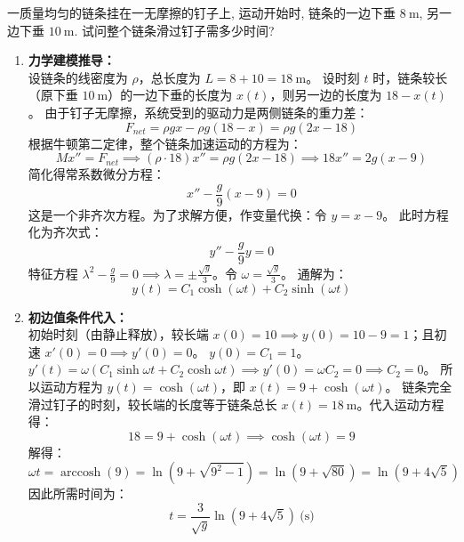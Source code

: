 \documentclass[lang=cn,11pt]{elegantbook}
\begin{document}
\begin{exercise}
一质量均匀的链条挂在一无摩擦的钉子上, 运动开始时, 链条的一边下垂 $8\ \mathrm{m}$, 另一边下垂 $10\ \mathrm{m}$. 试问整个链条滑过钉子需多少时间?
\end{exercise}
\begin{solution}
\begin{enumerate}
    \item \textbf{力学建模推导：}\\
    设链条的线密度为 $\rho$，总长度为 $L = 8 + 10 = 18\ \mathrm{m}$。
    设时刻 $t$ 时，链条较长（原下垂 $10\ \mathrm{m}$）的一边下垂的长度为 $x(t)$，则另一边的长度为 $18 - x(t)$。
    由于钉子无摩擦，系统受到的驱动力是两侧链条的重力差：
    \[
    F_{net} = \rho g x - \rho g (18-x) = \rho g(2x - 18)
    \]
    根据牛顿第二定律，整个链条加速运动的方程为：
    \[
    M x'' = F_{net} \implies (\rho \cdot 18) x'' = \rho g (2x - 18) \implies 18 x'' = 2g(x-9)
    \]
    简化得常系数微分方程：
    \[
    x'' - \frac{g}{9}(x-9) = 0
    \]
    这是一个非齐次方程。为了求解方便，作变量代换：令 $y = x - 9$。
    此时方程化为齐次式：
    \[
    y'' - \frac{g}{9} y = 0
    \]
    特征方程 $\lambda^2 - \frac{g}{9} = 0 \implies \lambda = \pm \frac{\sqrt{g}}{3}$。令 $\omega = \frac{\sqrt{g}}{3}$。
    通解为：
    \[
    y(t) = C_1\cosh(\omega t) + C_2\sinh(\omega t)
    \]

    \item \textbf{初边值条件代入：}\\
    初始时刻（由静止释放），较长端 $x(0) = 10 \implies y(0) = 10-9 = 1$；且初速 $x'(0) = 0 \implies y'(0) = 0$。
    $y(0) = C_1 = 1$。
    $y'(t) = \omega(C_1\sinh\omega t + C_2\cosh\omega t) \implies y'(0) = \omega C_2 = 0 \implies C_2 = 0$。
    所以运动方程为 $y(t) = \cosh(\omega t)$，即 $x(t) = 9 + \cosh(\omega t)$。
    链条完全滑过钉子的时刻，较长端的长度等于链条总长 $x(t) = 18\ \mathrm{m}$。代入运动方程得：
    \[
    18 = 9 + \cosh(\omega t) \implies \cosh(\omega t) = 9
    \]
    解得：
    \[
    \omega t = \operatorname{arccosh}(9) = \ln\left(9 + \sqrt{9^2 - 1}\right) = \ln(9 + \sqrt{80}) = \ln(9 + 4\sqrt{5})
    \]
    因此所需时间为：
    \[
    \boxed{t = \frac{3}{\sqrt{g}}\ln(9+4\sqrt{5})\ \text{(s)}}
    \]
\end{enumerate}
\end{solution}
\end{document}
